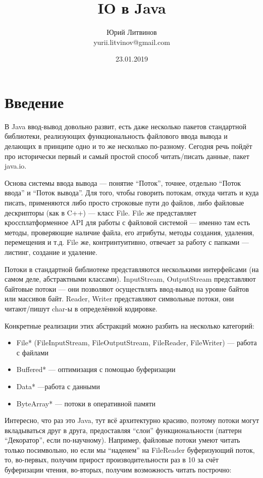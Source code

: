 \documentclass[a5paper]{article}
\title{IO в Java}
\author{Юрий Литвинов\\\small{yurii.litvinov@gmail.com}}
\date{23.01.2019}
\begin{document}
\maketitle
\thispagestyle{empty}

\section{Введение}

В Java ввод-вывод довольно развит, есть даже несколько пакетов стандартной библиотеки, реализующих функциональность файлового ввода вывода и делающих в принципе одно и то же несколько по-разному. Сегодня речь пойдёт про исторически первый и самый простой способ читать/писать данные, пакет java.io.

Основа системы ввода вывода --- понятие ``Поток'', точнее, отдельно ``Поток ввода'' и ``Поток вывода''. Для того, чтобы говорить потокам, откуда читать и куда писать, применяются либо просто строковые пути до файлов, либо файловые дескрипторы (как в C++) --- класс File. File же представляет кроссплатформенное API для работы с файловой системой --- именно там есть методы, проверяющие наличие файла, его атрибуты, методы создания, удаления, перемещения и т.д. File же, контринтуитивно, отвечает за работу с папками --- листинг, создание и удаление.

Потоки в стандартной библиотеке представляются несколькими интерфейсами (на самом деле, абстрактными классами). InputStream, OutputStream представляют байтовые потоки --- они позволяют осуществлять ввод-вывод на уровне байтов или массивов байт. Reader, Writer представляют символьные потоки, они читают/пишут char-ы в определённой кодировке.

Конкретные реализации этих абстракций можно разбить на несколько категорий:

\begin{itemize}
	\item File* (FileInputStream, FileOutputStream, FileReader, FileWriter) --- работа с файлами
	\item Buffered* --- оптимизация с помощью буферизации
	\item Data* ---работа с данными
	\item ByteArray* --- потоки в оперативной памяти
\end{itemize}

Интересно, что раз это Java, тут всё архитектурно красиво, поэтому потоки могут вкладываться друг в друга, предоставляя ``слои'' функциональности (паттерн ``Декоратор'', если по-научному). Например, файловые потоки умеют читать только посимвольно, но если мы ``наденем'' на FileReader буферизующий поток, то, во-первых, получим прирост производительности раз в 10 за счёт буферизации чтения, во-вторых, получим возможность читать построчно:
\end{document}
